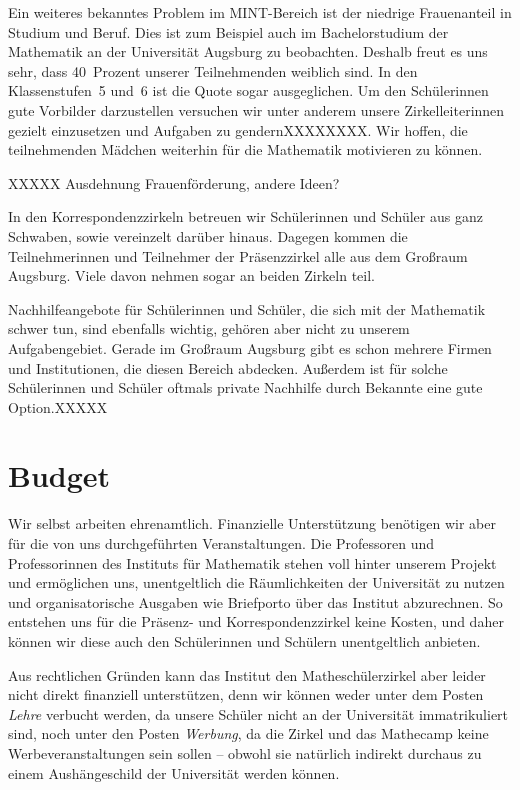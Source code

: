 \documentclass[12pt]{zettel}
\begin{document}
Ein weiteres bekanntes Problem im MINT-Bereich ist der niedrige Frauenanteil in
Studium und Beruf. Dies ist zum Beispiel auch im Bachelorstudium der Mathematik an der Universität Augsburg zu beobachten. Deshalb freut es uns sehr, dass 40~Prozent unserer
Teilnehmenden weiblich sind. In den Klassenstufen~5 und~6 ist die Quote sogar
ausgeglichen. Um den Schülerinnen gute Vorbilder darzustellen versuchen wir unter anderem unsere Zirkelleiterinnen gezielt einzusetzen und Aufgaben zu gendernXXXXXXXX. Wir hoffen, die teilnehmenden Mädchen weiterhin für die
Mathematik motivieren zu können.

XXXXX Ausdehnung Frauenförderung, andere Ideen?

In den Korrespondenzzirkeln betreuen wir Schülerinnen und Schüler aus ganz
Schwaben, sowie vereinzelt darüber hinaus. Dagegen kommen die Teilnehmerinnen
und Teilnehmer der Präsenzzirkel alle aus dem Großraum Augsburg. Viele davon
nehmen sogar an beiden Zirkeln teil.

Nachhilfeangebote für Schülerinnen und Schüler, die sich mit der Mathematik
schwer tun, sind ebenfalls wichtig, gehören aber nicht zu unserem
Aufgabengebiet. Gerade im Großraum Augsburg gibt es schon mehrere Firmen und
Institutionen, die diesen Bereich abdecken. Außerdem ist für solche
Schülerinnen und Schüler oftmals private Nachhilfe durch Bekannte eine gute
Option.XXXXX


\section{Budget}

Wir selbst arbeiten ehrenamtlich. Finanzielle Unterstützung benötigen wir aber
für die von uns durchgeführten Veranstaltungen. Die Professoren und
Professorinnen des Instituts für Mathematik stehen voll hinter unserem Projekt
und ermöglichen uns, unentgeltlich die Räumlichkeiten der Universität zu nutzen
und organisatorische Ausgaben wie Briefporto über das Institut abzurechnen.
So entstehen uns für die Präsenz- und Korrespondenzzirkel keine Kosten, und
daher können wir diese auch den Schülerinnen und Schülern unentgeltlich
anbieten.

Aus rechtlichen Gründen kann das Institut den Matheschülerzirkel aber leider nicht
direkt finanziell unterstützen, denn wir können weder unter dem Posten
\emph{Lehre} verbucht werden, da unsere Schüler nicht an der Universität
immatrikuliert sind, noch unter den Posten \emph{Werbung}, da die Zirkel und
das Mathecamp keine Werbeveranstaltungen sein sollen -- obwohl sie natürlich indirekt
durchaus zu einem Aushängeschild der Universität werden können.
\end{document}
